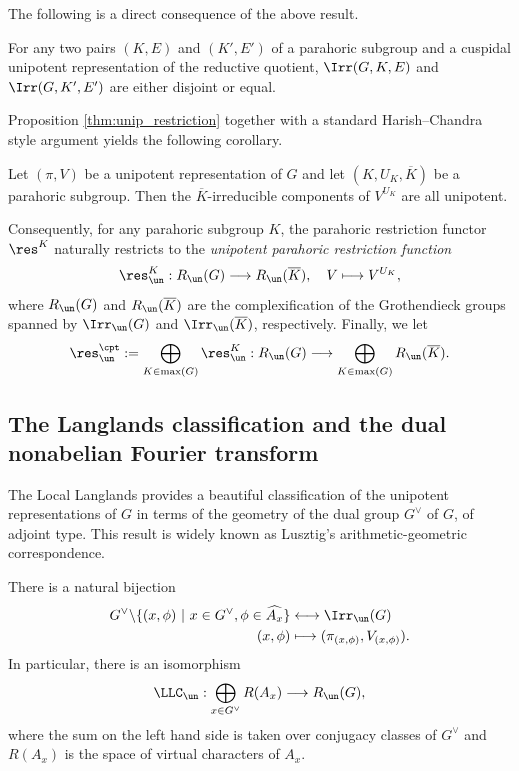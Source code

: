 The following is a direct consequence of the above result.
\begin{cor}\label{cor:unipotentblock_disjoint}
    For any two pairs $(K,E)$ and $(K',E')$ of a parahoric subgroup and a cuspidal unipotent representation of the reductive quotient, $\Irr(G,K,E)$ and $\Irr(G,K',E')$ are either disjoint or equal.
\end{cor}
Proposition \ref{thm:unip_restriction} together with a standard Harish--Chandra style argument yields the following corollary.
\begin{cor}
    Let $(\pi,V)$ be a unipotent representation of $G$ and let $(K,U_K,\overline{K})$ be a parahoric subgroup. Then the $\overline{K}$-irreducible components of $V^{U_K}$ are all unipotent.
\end{cor}

Consequently, for any parahoric subgroup $K$, the parahoric restriction functor $\res^K$ naturally restricts to the \textit{unipotent parahoric restriction function}
\begin{equation*}
    \res^K_{\un}:R_{\un}(G)\longrightarrow R_{\un}(\overline{K}),\quad V\longmapsto V^{U_K},
\end{equation*}
where $R_{\un}(G)$ and $R_{\un}(\overline{K})$ are the complexification of the Grothendieck groups spanned by $\Irr_{\un}(G)$ and $\Irr_{\un}(\overline{K})$, respectively. Finally, we let
$$\res^{\cpt}_{\un}:=\bigoplus_{K\in\max(G)}\res^K_{\un}:R_{\un}(G)\longrightarrow \bigoplus_{K\in\max(G)}R_{\un}(\overline{K}).$$

\subsection{The Langlands classification and the dual nonabelian Fourier transform}\label{subsec:Fourier_transform}

The Local Langlands provides a beautiful classification of the unipotent representations of $G$ in terms of the geometry of the dual group $G^\vee$ of $G$, of adjoint type. This result is widely known as Lusztig's arithmetic-geometric correspondence.
\begin{theorem} There is a natural bijection
    \begin{align*}
        G^\vee\backslash\{(x,\phi)\ |\ x\in G^\vee,\phi\in\widehat{A_x}\}&\longleftrightarrow \Irr_{\un}(G)\\
        (x,\phi)&\longmapsto (\pi_{(x,\phi)},V_{(x,\phi)}).
    \end{align*}
    In particular, there is an isomorphism
    \begin{equation}\label{eqn:arithmetic-geometric}
        \LLC_{\un}:\bigoplus_{x\in G^\vee}R(A_x)\longrightarrow R_{\un}(G),
    \end{equation}
    where the sum on the left hand side is taken over conjugacy classes of $G^\vee$ and $R(A_x)$ is the space of virtual characters of $A_x$.
\end{theorem}


